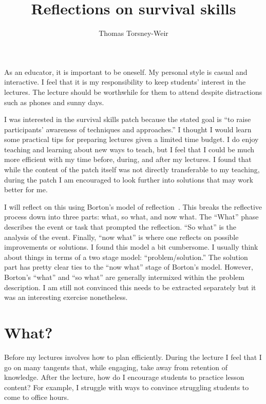 \documentclass[
]{article}
\title{Reflections on survival skills}
\author{Thomas Torsney-Weir}
\date{}
\begin{document}
\maketitle

As an educator, it is important to be oneself. My personal style is
casual and interactive. I feel that it is my responsibility to keep
students' interest in the lectures. The lecture should be worthwhile for
them to attend despite distractions such as phones and sunny days.

I was interested in the survival skills patch because the stated goal is
``to raise participants' awareness of techniques and approaches.'' I
thought I would learn some practical tips for preparing lectures given a
limited time budget. I do enjoy teaching and learning about new ways to
teach, but I feel that I could be much more efficient with my time
before, during, and after my lectures. I found that while the content of
the patch itself was not directly transferable to my teaching, during
the patch I am encouraged to look further into solutions that may work
better for me.

I will reflect on this using Borton's model of reflection~\cite{Borton:1970}.
This breaks the reflective process down into three parts: what, so what, and
now what. The ``What'' phase describes the event or task that prompted the
reflection. ``So what'' is the analysis of the event. Finally, ``now what'' is
where one reflects on possible improvements or solutions. I found this model a
bit cumbersome. I usually think about things in terms of a two stage model:
``problem/solution.'' The solution part has pretty clear ties to the ``now
what'' stage of Borton's model. However, Borton's ``what'' and ``so what'' are
generally intermixed within the problem description. I am still not convinced
this needs to be extracted separately but it was an interesting exercise
nonetheless.

\hypertarget{what}{%
\section{What?}\label{what}}

Before my lectures involves how to plan efficiently. During the lecture
I feel that I go on many tangents that, while engaging, take away from
retention of knowledge. After the lecture, how do I encourage students
to practice lesson content? For example, I struggle with ways to
convince struggling students to come to office hours.
\end{document}
